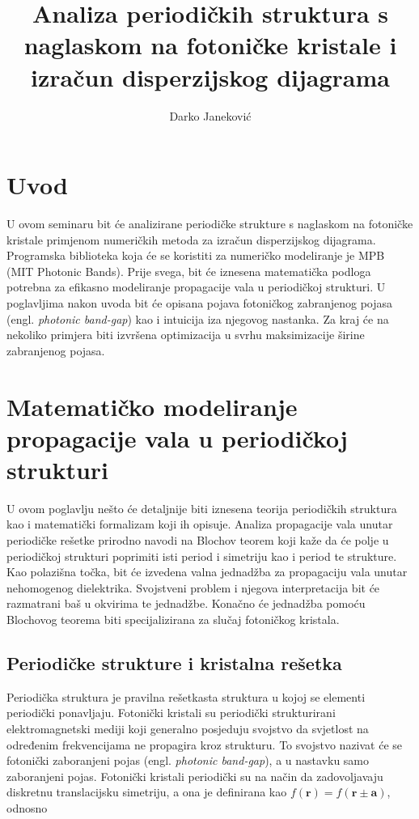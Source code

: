 \documentclass[utf8, seminar, numeric]{fer}
\begin{document}
\title{Analiza periodičkih struktura s naglaskom na fotoničke kristale
	   i izračun disperzijskog dijagrama}
\author{Darko Janeković}

\maketitle

\tableofcontents


\chapter{Uvod}
U ovom seminaru bit će analizirane periodičke strukture s naglaskom na fotoničke
kristale primjenom numeričkih metoda za izračun disperzijskog dijagrama.
Programska biblioteka koja će se koristiti za numeričko modeliranje je
MPB (MIT Photonic Bands)\cite{Johnson2001:mpb}. Prije svega, bit će iznesena
matematička podloga potrebna za efikasno modeliranje propagacije vala u
periodičkoj strukturi. U poglavljima nakon uvoda bit će opisana pojava fotoničkog
zabranjenog pojasa (engl. \textit{photonic band-gap}) kao i intuicija iza
njegovog nastanka. Za kraj će na nekoliko primjera biti izvršena optimizacija u
svrhu maksimizacije širine zabranjenog pojasa.


\chapter{Matematičko modeliranje propagacije vala u periodičkoj strukturi}

U ovom poglavlju nešto će detaljnije biti iznesena teorija periodičkih struktura
kao i matematički formalizam koji ih opisuje. Analiza propagacije vala unutar
periodičke rešetke prirodno navodi na Blochov teorem koji kaže da će polje u
periodičkoj strukturi poprimiti isti period i simetriju kao i period te strukture.
Kao polazišna točka, bit će izvedena valna jednadžba za propagaciju vala unutar
nehomogenog dielektrika. Svojstveni problem i njegova interpretacija bit će
razmatrani baš u okvirima te jednadžbe. Konačno će jednadžba pomoću Blochovog
teorema biti specijalizirana za slučaj fotoničkog kristala.


\section{Periodičke strukture i kristalna rešetka}

Periodička struktura je pravilna rešetkasta struktura u kojoj se elementi
periodički ponavljaju. Fotonički kristali su periodički strukturirani
elektromagnetski mediji koji generalno posjeduju svojstvo da svjetlost na
određenim frekvencijama ne propagira kroz strukturu. To svojstvo nazivat će se
fotonički zaboranjeni pojas (engl. \textit{photonic band-gap}), a u nastavku
samo zaboranjeni pojas. Fotonički kristali periodički su na način da
zadovoljavaju diskretnu translacijsku simetriju, a ona je definirana kao
${f(\mathbf{r}) = f(\mathbf{r} \pm \mathbf{a})}$, odnosno
\end{document}
